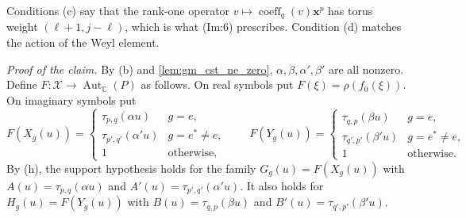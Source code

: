 \documentclass[11pt]{article}
\theoremstyle{definition}
\theoremstyle{remark}
\newcommand{\CC}{\mathbb{C}}
\DeclareMathOperator{\Aut}{Aut}
\DeclareMathOperator{\coeff}{coeff}
\begin{document}
Conditions (c) say that the rank-one operator $v\mapsto\coeff_q(v)\mathbf x^p$ has torus weight $(\ell+1,j-\ell)$, which is what (Im:6) prescribes. Condition (d) matches the action of the Weyl element.

\emph{Proof of the claim.} By (b) and \cref{lem:gm_cst_ne_zero}, $\alpha,\beta,\alpha',\beta'$ are all nonzero. Define $F\colon\mathcal X\to\Aut_\CC(P)$ as follows. On real symbols put $F(\xi)=\rho(f_0(\xi))$. On imaginary symbols put
\[
F(X_g(u))=\begin{cases}\tau_{p,q}(\alpha u)&g=e,\\ \tau_{p',q'}(\alpha'u)&g=e^\ast\neq e,\\ 1&\text{otherwise,}\end{cases}\qquad
F(Y_g(u))=\begin{cases}\tau_{q,p}(\beta u)&g=e,\\ \tau_{q',p'}(\beta'u)&g=e^\ast\ne e,\\ 1&\text{otherwise.}\end{cases}
\]
By (h), the support hypothesis holds for the family $G_g(u)=F(X_g(u))$ with $A(u)=\tau_{p,q}(\alpha u)$ and $A'(u)=\tau_{p',q'}(\alpha'u)$. It also holds for $H_g(u)=F(Y_g(u))$ with $B(u)=\tau_{q,p}(\beta u)$ and $B'(u)=\tau_{q',p'}(\beta'u)$.
\end{document}
